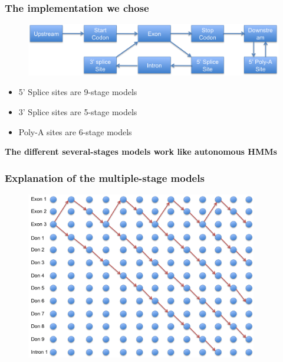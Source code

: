 \documentclass{beamer}
\begin{document}
\begin{frame}
\frametitle{The implementation we chose}
	\begin{figure}
	\includegraphics[width=1.0\textwidth]{../picturesforthepresentation/combinedHMM.png}
	\end{figure}
	
	\begin{itemize}
		\item 5' Splice sites are 9-stage models
		\item 3' Splice sites are 5-stage models
		\item Poly-A sites are 6-stage models 
	\end{itemize}
	
	\pause\begin{center}
		\textbf{The different several-stages models work like autonomous HMMs}
	\end{center}
	
\end{frame}

\begin{frame}
\frametitle{Explanation of the multiple-stage models}
	\begin{figure}
	\includegraphics[width=0.9\textwidth]{../picturesforthepresentation/Stages_viterbi.png}
	\end{figure}
	
	
	
\end{frame}
\end{document}

